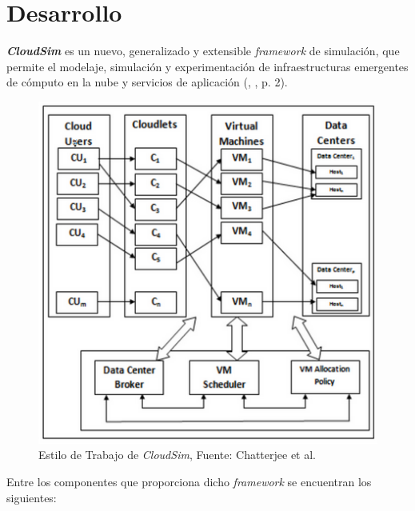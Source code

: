 \documentclass[jou,apacite]{apa6}
\begin{document}
\section{Desarrollo}

 \textit{\textbf{CloudSim}} es un nuevo, generalizado y extensible \textit{framework} de simulaci\'on, que permite el modelaje, simulaci\'on y experimentaci\'on de infraestructuras emergentes de c\'omputo en la nube y servicios de aplicaci\'on (\citeauthor{calheiros2011cloudsim}, \citeyear{calheiros2011cloudsim}, p. 2).


\setcounter{figure}{2}
\renewcommand\thefigure{\arabic{figure}}
\begin{figure}[h!]
	\centering
	\includegraphics[scale=0.5]{media/imagenuno}
	\caption{Estilo de Trabajo de \textit{CloudSim}, Fuente: Chatterjee et al.}
	\label{fig:TrabajoCloudsim}
	
\end{figure}

Entre los componentes que proporciona dicho \textit{framework} se encuentran los siguientes:
\end{document}

